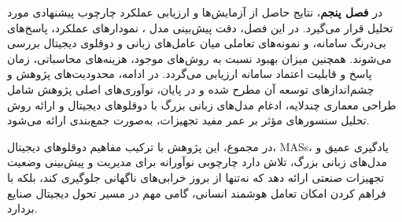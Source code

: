 در \textbf{فصل پنجم}، نتایج حاصل از آزمایش‌ها و ارزیابی عملکرد چارچوب پیشنهادی مورد تحلیل قرار می‌گیرد. در این فصل، دقت پیش‌بینی مدل ، نمودارهای عملکرد، پاسخ‌های بی‌درنگ سامانه، و نمونه‌های تعاملی میان عامل‌های زبانی و دوقلوی دیجیتال بررسی می‌شوند. همچنین میزان بهبود نسبت به روش‌های موجود، هزینه‌های محاسباتی، زمان پاسخ و قابلیت اعتماد سامانه ارزیابی می‌گردد. در ادامه، محدودیت‌های پژوهش و چشم‌اندازهای توسعه آن مطرح شده و در پایان، نوآوری‌های اصلی پژوهش شامل طراحی معماری چندلایه، ادغام مدل‌های زبانی بزرگ با دوقلوهای دیجیتال و ارائه روش تحلیل سنسورهای مؤثر بر عمر مفید تجهیزات، به‌صورت جمع‌بندی ارائه می‌شود.


\noindent
در مجموع، این پژوهش با ترکیب مفاهیم دوقلوهای دیجیتال، \glspl{MAS}، یادگیری عمیق و مدل‌های زبانی بزرگ، تلاش دارد چارچوبی نوآورانه برای مدیریت و پیش‌بینی وضعیت تجهیزات صنعتی ارائه دهد که نه‌تنها از بروز خرابی‌های ناگهانی جلوگیری کند، بلکه با فراهم کردن امکان تعامل هوشمند انسانی، گامی مهم در مسیر تحول دیجیتال صنایع بردارد.


%
%
%
%
%
%
%
%
%
